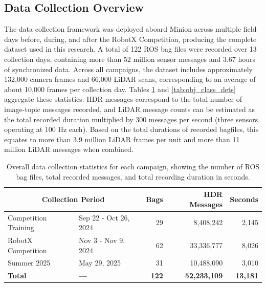 \documentclass{erauthesis}
\begin{document}
\subsection{Data Collection Overview}
\label{sec:data_overview}

The data collection framework was deployed aboard Minion across multiple field days before, during, and after the RobotX Competition, producing the complete dataset used in this research.
A total of 122 ROS bag files were recorded over 13 collection days,  containing more than 52 million sensor messages and 3.67 hours of synchronized data.
Across all campaigns, the dataset includes approximately 132,000 camera frames and 66,000 LiDAR scans, corresponding to an average of about 10,000 frames per collection day.
Tables \ref{tab:rosbag_stats} and \ref{tab:obj_class_dets} aggregate these statistics.  
HDR messages correspond to the total number of image-topic messages recorded, and LiDAR message counts can be estimated as the total recorded duration multiplied by 300 messages per second (three sensors operating at 100 Hz each).
Based on the total durations of recorded bagfiles, this equates to more than 3.9 million LiDAR frames per unit and more than 11 million LiDAR messages when combined.

\begin{table}[htbp]
\centering
\begin{tabular}{llrrr}
\hline
\multicolumn{2}{c}{Collection Period} & Bags & HDR Messages & Seconds \\
\hline
\hline
Competition Training & Sep 22 - Oct 26, 2024 & 29 & 8,408,242 & 2,145 \\
RobotX Competition & Nov 3 - Nov 9, 2024 & 62 & 33,336,777 & 8,026 \\
Summer 2025  & May 29, 2025 & 31 & 10,488,090 & 3,010 \\
\hline
\textbf{Total} & \textbf{---} & \textbf{122} & \textbf{52,233,109} & \textbf{13,181} \\
\hline
\end{tabular}
\caption{Overall data collection statistics for each campaign, showing the number of ROS bag files, total recorded messages, and total recording duration in seconds.}
\label{tab:rosbag_stats}
\end{table}
\end{document}

